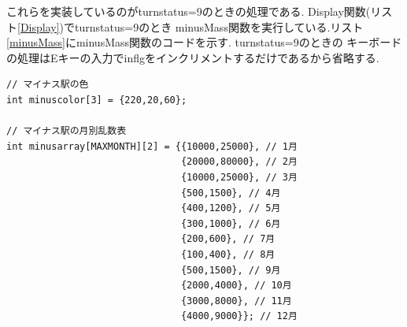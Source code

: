 \documentclass[a4j]{jarticle}
\begin{document}
        これらを実装しているのがturnstatus=9のときの処理である. Display関数(リスト\ref{Display})でturnstatus=9のとき
        minusMass関数を実行している.リスト\ref{minusMass}にminusMass関数のコードを示す. turnstatus=9のときの
        キーボードの処理はEキーの入力でinflgをインクリメントするだけであるから省略する.
        \begin{lstlisting}[basicstyle=\ttfamily\footnotesize, frame=single,label=minusMass,caption=minusMass関数]
// マイナス駅の色
int minuscolor[3] = {220,20,60};

// マイナス駅の月別乱数表
int minusarray[MAXMONTH][2] = {{10000,25000}, // 1月
                               {20000,80000}, // 2月
                               {10000,25000}, // 3月
                               {500,1500}, // 4月
                               {400,1200}, // 5月
                               {300,1000}, // 6月
                               {200,600}, // 7月
                               {100,400}, // 8月
                               {500,1500}, // 9月
                               {2000,4000}, // 10月
                               {3000,8000}, // 11月
                               {4000,9000}}; // 12月


\end{lstlisting}
\end{document}
